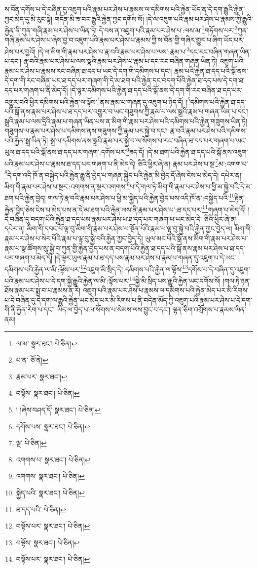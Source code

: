 ས་བོན་དགོས་པ་དེ་བཞིན་དུ་འཇུག་པའི་རྣམ་པར་ཤེས་པ་རྣམས་ལ་དམིགས་པའི་རྐྱེན་ཡོད་ན་དེ་དག་རྒྱུའི་རྐྱེན་ཀྱང་མེད་དུ་མི་རུང་སྟེ། གདོན་མི་ཟ་བར་རྒྱུའི་རྐྱེན་ཀྱང་དགོས་སོ། །དེ་ལ་འཇུག་པའི་རྣམ་པར་ཤེས་པ་རྣམས་ཀྱི་རྒྱུའི་རྐྱེན་ནི་ཀུན་གཞི་རྣམ་པར་ཤེས་པ་ཡིན་ཏེ། དེ་བས་ན་འཇུག་པའི་རྣམ་པར་ཤེས་པ་:ལས་མ་\footnote{ལ་མ་  སྣར་ཐང་།  པེ་ཅིན། }གཏོགས་པར་\footnote{པ་ན་  ཅོ་ནེ། }ཀུན་གཞི་རྣམ་པར་ཤེས་པ་ཞེས་བྱ་བ་འཇུག་པའི་རྣམ་པར་ཤེས་པ་རྣམས་ཀྱི་ས་བོན་གྱི་གཞིར་གྱུར་པ་ཞིག་ཡོད་པར་ཤེས་པར་བྱའོ། །དེ་ལ་མིག་གི་རྣམ་པར་ཤེས་པ་རྣ་བའི་རྣམ་པར་ཤེས་པ་ལས་:རྣམ་པ་\footnote{རྣམ་པར་  སྣར་ཐང་། }དང་རང་བཞིན་གཞན་ཡིན་པ་དང་། རྣ་བའི་རྣམ་པར་ཤེས་པ་ལས་སྣའི་རྣམ་པར་ཤེས་པ་རྣམ་པ་དང་རང་བཞིན་གཞན་ཡིན་ཏེ། འཇུག་པའི་རྣམ་པར་ཤེས་པ་རྣམས་རང་བཞིན་ཐ་དད་པ་ཡང་དེ་དག་གི་དམིགས་པ་དང་། རྣམ་པའི་རྐྱེན་ཐ་དད་པའི་སྒོ་ནས་དེ་དག་གི་རང་བཞིན་ཡང་ཐ་དད་པར་གཞག་གི་དེ་མ་ཐག་པའི་རྐྱེན་དང་བདག་པོའི་རྐྱེན་ཐ་དད་པས་དེ་དག་ཐ་དད་པར་གཞག་པ་ནི་མེད་དོ། །དེ་ལྟར་དམིགས་པའི་རྐྱེན་ཐ་དད་པའི་སྒོ་ནས་དེ་དག་གི་རང་བཞིན་ཐ་དད་པར་འགྱུར་བའི་ཕྱིར་དམིགས་པའི་རྐྱེན་ལ་ལྟོས་\footnote{བལྟོས་  སྣར་ཐང་།  པེ་ཅིན། }ནས་རྣམ་པ་གཞན་དུ་འཇུག་པ་ཉིད་དོ། །\footnote{། །ཞེས་བཤད་དོ་  སྣར་ཐང་།  པེ་ཅིན། }དམིགས་པའི་རྐྱེན་ཐ་དད་པའི་སྒོ་ནས་རྣམ་པར་ཤེས་པ་ཐ་དད་པར་འགྱུར་བ་ཡང་གཟུགས་ཀྱི་རྣམ་པ་ལས་སྒྲའི་རྣམ་པ་གཞན་ཡིན་པ་དང་། སྒྲའི་རྣམ་པ་ལས་དྲིའི་རྣམ་པ་གཞན་ཡིན་པས་ན་མིག་གི་རྣམ་པར་ཤེས་པའི་དམིགས་པའི་རྐྱེན་གཟུགས་ཡིན་ཏེ། གཟུགས་ལ་རྣམ་པར་ཤེས་པ་དམིགས་ནས་གཟུགས་ཀྱི་རྣམ་པར་སྐྱེ་བ་དང་། རྣ་བའི་རྣམ་པར་ཤེས་པའི་དམིགས་པའི་རྐྱེན་སྒྲ་ཡིན་ཏེ། སྒྲ་ལ་དམིགས་ནས་སྒྲའི་རྣམ་པར་སྐྱེ་བ་ལ་སོགས་པ་རང་བཞིན་ཐ་དད་པར་གཞག་པ་ཡང་ཡུལ་ཐ་དད་པའི་སྒོ་ནས་ཐ་དད་པར་གཞག་:དགོས་པར་\footnote{དགོས་པས་  སྣར་ཐང་།  པེ་ཅིན། }ཟད་དོ། །དེ་མ་ཐག་པའི་རྐྱེན་ཐ་དད་པའི་སྒོ་ནས་འཇུག་པའི་རྣམ་པར་ཤེས་པ་རྣམས་ཐ་དད་པར་གཞག་པ་ནི་མེད་དེ། ཅིའི་ཕྱིར་ཞེ་ན། རྣམ་པར་ཤེས་པ་སྔ་\footnote{ལྔ་  པེ་ཅིན། }མ་:འགག་པ་\footnote{འགགས་པ་  སྣར་ཐང་།  པེ་ཅིན། }དེ་དག་འདི་ཁོ་ན་བསྐྱེད་པའི་རྐྱེན་རྒྱུ་ནི་བྱེད་པ་གཞན་སྐྱེད་པའི་རྐྱེན་མི་བྱེད་དོ་ཞེས་ངེས་པ་མེད་དེ། དཔེར་ན། མིག་གི་རྣམ་པར་ཤེས་པ་སྔར་:འགགས་ན་སྔར་འགགས་\footnote{འགགས་  སྣར་ཐང་།  པེ་ཅིན། }པ་དེ་གལ་ཏེ་མིག་གི་རྣམ་པར་ཤེས་པ་ཕྱི་མ་སྐྱེ་བའི་དེ་མ་ཐག་པའི་རྐྱེན་བྱེད། གལ་ཏེ་རྣ་བའི་རྣམ་པར་ཤེས་པ་ཕྱི་མ་སྐྱེད་པའི་རྐྱེན་བྱེད་པས་འདི་ཁོ་ན་:བསྐྱེད་པའི་\footnote{སྐྱེད་པའི་  སྣར་ཐང་།  པེ་ཅིན། }རྟེན་རྐྱེན་བྱེད་ཅེས་ངེས་པ་མེད་པས་ན་དེ་མ་ཐག་པའི་རྐྱེན་ལས་ནི་རྣམ་པར་ཤེས་པ་:ཐ་དད་པར་\footnote{ཐ་དད་པའི་  པེ་ཅིན། }གཞག་པ་མེད་དོ། །དེ་བཞིན་དུ་བདག་པོའི་རྐྱེན་ཐ་དད་པས་རྣམ་པར་ཤེས་པ་ཐ་དད་པར་གཞག་པ་ཡང་མེད་དེ། ཅིའི་ཕྱིར་ཞེ་ན། དཔེར་ན། མིག་གི་དབང་པོ་ལྟ་བུ་མིག་གི་རྣམ་པར་ཤེས་པ་སྔོན་པོའི་རྣམ་པ་ལྟ་བུ་སྐྱེ་བའི་རྐྱེན་ཀྱང་བྱེད་ལ། མིག་གི་རྣམ་པར་ཤེས་པ་སེར་པོའི་རྣམ་པ་ལྟ་བུ་སྐྱེ་བའི་རྐྱེན་ཀྱང་བྱེད་དེ། ཡུལ་མང་པོའི་སྒོ་ནས་མིག་གི་རྣམ་པར་ཤེས་པ་རྣམ་པ་སྣ་ཚོགས་སུ་སྐྱེ་བ་ཀུན་གྱི་རྐྱེན་བྱེད་པས་ན་བདག་པོའི་རྐྱེན་ཐ་དད་པའི་སྒོ་ནས་རྣམ་པར་ཤེས་པ་ཐ་དད་པར་གཞག་པ་མེད་དོ། །དེ་ལྟར་ཡུལ་རྣམ་པ་ཐ་དད་པས་རྣམ་པར་ཤེས་པ་རྣམ་པ་གཞན་དུ་འཇུག་པ་དེ་ཡང་དམིགས་པའི་རྐྱེན་ལ་མི་:ལྟོས་པར་\footnote{བལྟོས་པར་  སྣར་ཐང་།  པེ་ཅིན། }འཇུག་མི་སྲིད་དེ། དམིགས་པའི་རྐྱེན་ལ་ལྟོས་\footnote{བལྟོས་  སྣར་ཐང་།  པེ་ཅིན། }དགོས་པ་དེ་བཞིན་དུ་འཇུག་པའི་རྣམ་པར་ཤེས་པ་དེ་དག་སྐྱེ་རྒྱུའི་རྐྱེན་ལ་མི་:ལྟོས་པར་\footnote{བལྟོས་པར་  སྣར་ཐང་།  པེ་ཅིན། }སྐྱེ་མི་སྲིད་པས་རྒྱུའི་རྐྱེན་ཡང་དགོས་སོ། །གལ་ཏེ་ཉན་ཐོས་རྣམ་པར་སྨྲ་བ་པ་རྣམས་ན་རེ། འཇུག་པའི་རྣམ་པར་ཤེས་པ་རྣམས་ལ་དམིགས་པའི་རྐྱེན་མེད་པར་མི་རིགས་པ་དེ་བཞིན་དུ་དེ་དག་ལ་རྒྱུའི་རྐྱེན་ཡང་མེད་པར་མི་རིགས་པ་ནི་བདེན་མོད་ཀྱི་འཇུག་པའི་རྣམ་པར་ཤེས་པ་དེ་དག་གི་ནི་རྐྱེན་རེག་པ་དང་། ཡིད་ལ་བྱེད་པ་ལ་སོགས་པ་སེམས་ལས་བྱུང་བ་དང་། ལྷན་ཅིག་འགྲོགས་པ་རྣམས་ཡིན་ནམ། 